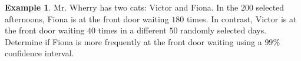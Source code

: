 \documentclass[12pt]{amsart}
\theoremstyle{definition}
\newtheorem{ex}{Example}
\begin{document}
\begin{ex}
	Mr. Wherry has two cats: Victor and Fiona. In the $200$ selected afternoons, Fiona is at the front door waiting $180$ times. In contrast, Victor is at the front door waiting $40$ times in a different $50$ randomly selected days. Determine if Fiona is more frequently at the front door waiting using a $99\%$ confidence interval.
\end{ex}
 
\end{document}
